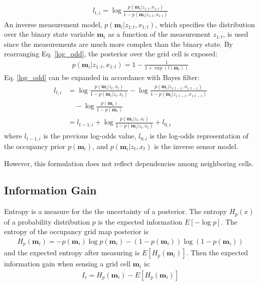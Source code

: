 \documentclass[letterpaper, 10 pt, conference]{ieeeconf}  %
\begin{document}
\begin{align}
    l_{t,i} = \log\frac{p(\textbf{m}_i | z_{1:t},x_{1:t})}{1-p(\textbf{m}_i | z_{1:t},x_{1:t})}
    \label{log_odd}
\end{align}
An inverse measurement model, $p(\textbf{m}_i | z_{1:t},x_{1:t})$, which specifies the distribution over the binary state variable $\textbf{m}_i$ as a function of the measurement $z_{1:t}$, is used since the measurements are much more complex than the binary state. 
\noindent By rearranging Eq. \ref{log_odd}, the posterior over the grid cell is exposed:
\begin{align}
    p(\textbf{m}_i | z_{1:t},x_{1:t}) = 1-\frac{1}{1+\exp(l(\textbf{m}_i))}
\end{align}
\noindent Eq. \ref{log_odd} can be expanded in accordance with Bayes filter:
\begin{align}
    l_{t,i} &= \log\frac{p(\textbf{m}_i | z_{t},x_{t})}{1-p(\textbf{m}_i | z_{t},x_{t})} - \log\frac{p(\textbf{m}_i | z_{1:t-1}, x_{1:t-1})}{1-p(\textbf{m}_i | z_{1:t-1}, x_{1:t-1})} \nonumber \\
    &\quad - \log\frac{p(\textbf{m}_i)}{1-p(\textbf{m}_i)} \nonumber \\
    &= l_{t-1,i} + \log\frac{p(\textbf{m}_i | z_{t},x_{t})}{1-p(\textbf{m}_i | z_{t},x_{t})} + l_{0,i}
\end{align}
\noindent where $l_{t-1,i}$ is the previous log-odds value, $l_{0,i}$ is the log-odds representation of the occupancy prior $p(\textbf{m}_i)$, and $p(\textbf{m}_i | z_{t},x_{t})$ is the inverse sensor model.

However, this formulation does not reflect dependencies among neighboring cells. 

\subsection{Information Gain}
Entropy is a measure for the the uncertainty of a posterior. The entropy $H_p(x)$ of a probability distribution $p$ is the expected information $E[-\log p]$. The entropy of the occupancy grid map posterior is
\begin{align}
    H_p(\textbf{m}_i) = -p(\textbf{m}_i) \log p(\textbf{m}_i) - (1-p(\textbf{m}_i)) \log(1-p(\textbf{m}_i))
\end{align}
\noindent and the expected entropy after measuring is $E[H_{p}(\textbf{m}_i)]$. Then the expected information gain when sensing a grid cell $\textbf{m}_i$ is: 
\begin{align}
    I_i = H_p(\textbf{m}_i) - E[H_{p}(\textbf{m}_i)]
\end{align}
\end{document}
